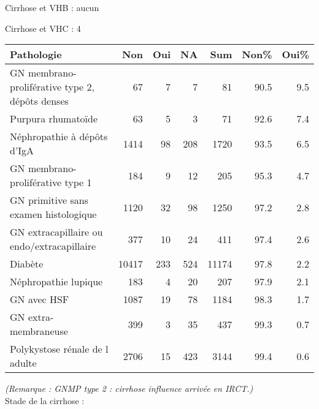 \documentclass[11pt,a4paper]{article}\usepackage[]{graphicx}\usepackage[]{color}
\begin{document}
Cirrhose et VHB : aucun

Cirrhose et VHC : 4

\begin{table}[H]
\centering
\begin{tabular}{lrrrrrr}
  \hline
Pathologie & Non & Oui & NA & Sum & Non\% & Oui\% \\ 
  \hline
GN membrano-proliférative type 2, dépôts denses & 67 &  7 &  7 & 81 & 90.5 & 9.5 \\ 
  Purpura rhumatoïde & 63 &  5 &  3 & 71 & 92.6 & 7.4 \\ 
  Néphropathie à dépôts d'IgA & 1414 & 98 & 208 & 1720 & 93.5 & 6.5 \\ 
  GN membrano-proliférative type 1 & 184 &  9 & 12 & 205 & 95.3 & 4.7 \\ 
  GN primitive sans examen histologique & 1120 & 32 & 98 & 1250 & 97.2 & 2.8 \\ 
  GN extracapillaire ou endo/extracapillaire & 377 & 10 & 24 & 411 & 97.4 & 2.6 \\ 
  Diabète & 10417 & 233 & 524 & 11174 & 97.8 & 2.2 \\ 
  Néphropathie lupique & 183 &  4 & 20 & 207 & 97.9 & 2.1 \\ 
  GN avec HSF & 1087 & 19 & 78 & 1184 & 98.3 & 1.7 \\ 
  GN extra-membraneuse & 399 &  3 & 35 & 437 & 99.3 & 0.7 \\ 
  Polykystose rénale de l adulte & 2706 & 15 & 423 & 3144 & 99.4 & 0.6 \\ 
   \hline
\end{tabular}
\end{table}


\textit{(Remarque : GNMP type 2 : cirrhose influence arrivée en IRCT.)}
~\\

Stade de la cirrhose :
\end{document}
